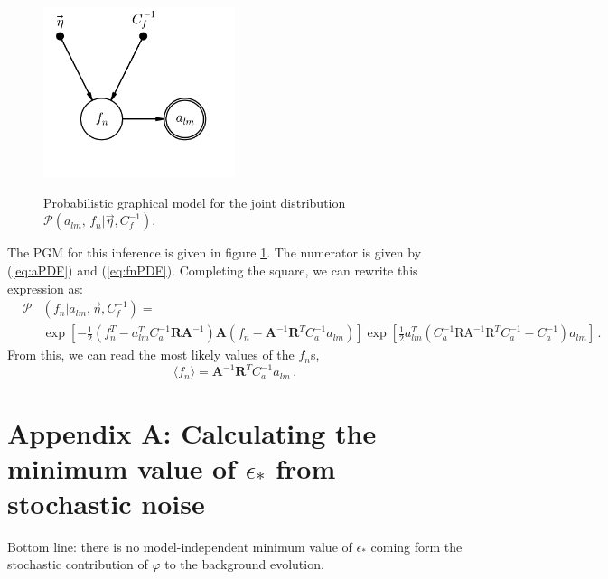 \documentclass[prd, onecolumn, floatfix, letterpaper, nofootinbib, amsmath, amssymb, superscriptaddress]{revtex4}
\renewcommand{\(}{\left(}
\renewcommand{\)}{\right)}
\renewcommand{\[}{\left[}
\renewcommand{\]}{\right]}
\def\be{\begin{equation}}
\def\ee{\end{equation}}
\def\bea{\begin{eqnarray}}
\def\eea{\end{eqnarray}}
\begin{document}
\begin{figure}[H]
\begin{center}
\centering
\includegraphics[width=0.50\textwidth]{pgm/simple-map.png}\\
\caption{\label{simplepng} Probabilistic graphical model for the joint distribution $\mathcal{P}(a_{lm},\,f_n |\vec{\eta}, C_f^{-1} )$.
}

\end{center}
\end{figure}

The PGM for this inference is given in figure \ref{simplepng}. The numerator is given by (\ref{eq:aPDF}) and (\ref{eq:fnPDF}). Completing the square, we can rewrite this expression as:
\bea
	&\mathcal{P}&(f_n | a_{lm}, \vec{\eta}, C_f^{-1})=\\
	&&\exp\left[-\frac{1}{2} \left( f_n^T-a^T_{lm}C_a^{-1}\mathbf{R}\mathbf{A}^{-1} \right) \mathbf{A}\left(f_n-\mathbf{A}^{-1}\mathbf{R}^TC_a^{-1} a_{lm} \right) \right]\exp\left[\frac{1}{2} a_{lm}^T\left(C_a^{-1}\mathrm{R} \mathrm{A}^{-1} \mathrm{R}^TC_a^{-1} -C_a^{-1} \right) a_{lm} \right]\, .
\eea
From this, we can read the most likely values of the $f_n$s,
\be
	\langle f_n \rangle=\mathbf{A}^{-1}\mathbf{R}^TC_a^{-1} a_{lm}\, .
\ee


\newpage
\section{Appendix A: Calculating the minimum value of $\epsilon_*$ from stochastic noise}

Bottom line: there is no model-independent minimum value of $\epsilon_*$ coming form the stochastic contribution of $\varphi$ to the background evolution.
\end{document}
